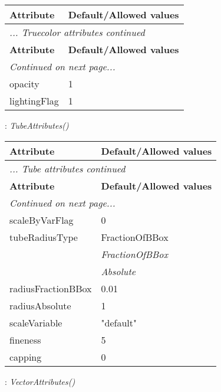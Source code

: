 \documentclass[10pt,a4paper]{report}
\begin{document}
\begin{longtable}{ll}
{\bf Attribute} & {\bf Default/Allowed values} \\
\hline \hline
\endfirsthead
\multicolumn{2}{l}{{\it ... Truecolor attributes continued}} \\
{\bf Attribute} & {\bf Default/Allowed values} \\
\hline \hline
\endhead
\hline
\multicolumn{2}{l}{{\it Continued on next page...}} \\
\endfoot
\hline
\endlastfoot

opacity  &  1 \\
lightingFlag  &  1 \\
\end{longtable}

\newpage

{}
: {\it TubeAttributes() }\\[-3mm]

\begin{longtable}{ll}
{\bf Attribute} & {\bf Default/Allowed values} \\
\hline \hline
\endfirsthead
\multicolumn{2}{l}{{\it ... Tube attributes continued}} \\
{\bf Attribute} & {\bf Default/Allowed values} \\
\hline \hline
\endhead
\hline
\multicolumn{2}{l}{{\it Continued on next page...}} \\
\endfoot
\hline
\endlastfoot

scaleByVarFlag  &  0 \\
tubeRadiusType  &  FractionOfBBox   \\
 & {\it  FractionOfBBox} \\
 & {\it  Absolute} \\
radiusFractionBBox  &  0.01 \\
radiusAbsolute  &  1 \\
scaleVariable  &  "default" \\
fineness  &  5 \\
capping  &  0 \\
\end{longtable}

\newpage

{}
: {\it VectorAttributes() }\\[-3mm]
\end{document}

